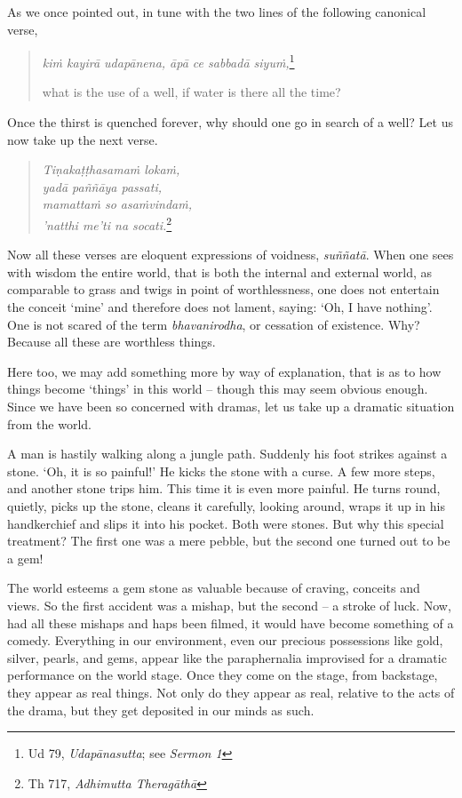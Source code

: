 As we once pointed out, in tune with the two lines of the following canonical verse,

\begin{quote}
\emph{kiṁ kayirā udapānena, āpā ce sabbadā siyuṁ,}\footnote{Ud 79, \emph{Udapānasutta}; see \emph{Sermon 1}}

what is the use of a well, if water is there all the time?
\end{quote}

Once the thirst is quenched forever, why should one go in search of a well? Let us now take up the next verse.

\begin{quote}
\emph{Tiṇakaṭṭhasamaṁ lokaṁ,}\\
\emph{yadā paññāya passati,}\\
\emph{mamattaṁ so asaṁvindaṁ,}\\
\emph{'natthi me'ti na socati.}\footnote{Th 717, \emph{Adhimutta Theragāthā}}
\end{quote}

Now all these verses are eloquent expressions of voidness, \emph{suññatā}. When one sees with wisdom the entire world, that is both the internal and external world, as comparable to grass and twigs in point of worthlessness, one does not entertain the conceit `mine' and therefore does not lament, saying: `Oh, I have nothing'. One is not scared of the term \emph{bhavanirodha}, or cessation of existence. Why? Because all these are worthless things.

Here too, we may add something more by way of explanation, that is as to how things become `things' in this world -- though this may seem obvious enough. Since we have been so concerned with dramas, let us take up a dramatic situation from the world.

A man is hastily walking along a jungle path. Suddenly his foot strikes against a stone. `Oh, it is so painful!' He kicks the stone with a curse. A few more steps, and another stone trips him. This time it is even more painful. He turns round, quietly, picks up the stone, cleans it carefully, looking around, wraps it up in his handkerchief and slips it into his pocket. Both were stones. But why this special treatment? The first one was a mere pebble, but the second one turned out to be a gem!

The world esteems a gem stone as valuable because of craving, conceits and views. So the first accident was a mishap, but the second -- a stroke of luck. Now, had all these mishaps and haps been filmed, it would have become something of a comedy. Everything in our environment, even our precious possessions like gold, silver, pearls, and gems, appear like the paraphernalia improvised for a dramatic performance on the world stage. Once they come on the stage, from backstage, they appear as real things. Not only do they appear as real, relative to the acts of the drama, but they get deposited in our minds as such.

